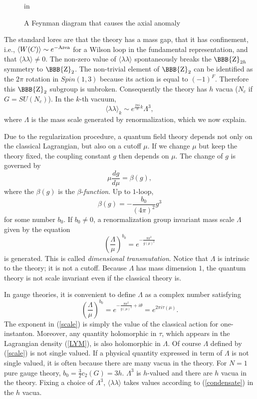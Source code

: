 \documentclass[lecture]{qft-l}
\newcommand{\lam}{\lambda}
\newcommand{\tht}{\theta}
\newcommand{\Lam}{\varLambda}
\newcommand{\ZZ}{{\mbox{\BBB{Z}}}}
\newcommand{\bef}{\begin{figure}[h]
		\vspace{3ex}}
\newcommand{\enf}{\end{figure}}
\newcommand{\bra}{\langle}
\newcommand{\ket}{\rangle}
\newcommand{\e}[1]{e^{{#1}}}
\newcommand{\ii}{i}
\newcommand{\dr}{d}
\numberwithin{figure}{chapter}
\begin{document}
\bef
{} in
\centerline{}
\caption{\protect\label{AX}A Feynman diagram that causes the axial anomaly}
\enf

The standard lores are that the theory has a mass gap,
that it has confinement, i.e., $\bra W(C)\ket\sim\e{-{{\rm Area}}}$
for a Wilson loop in the fundamental representation,
and that $\bra\lam\lam\ket\ne0$.
The non-zero value of $\bra\lam\lam\ket$ spontaneously breaks the $\ZZ_{2h}$
symmetry to $\ZZ_2$.
The non-trivial element of $\ZZ_2$ can be identified as the $2\pi$ rotation 
in $\mathit{Spin}(1,3)$ because its action is equal to $(-1)^F$.
Therefore this $\ZZ_2$ subgroup is unbroken.
Consequently the theory has $h$ vacua ($N_c$ if $G=SU(N_c)$).
In the $k$-th vacuum,
	\begin{equation}\label{condensate}
\bra\lam\lam\ket_k\sim\e{\frac{2\pi\ii}{h}k}\Lam^3,
	\end{equation}
where $\Lam$ is the mass scale generated by renormalization, which we now
explain.

Due to the regularization procedure, a quantum field theory depends 
not only on the classical Lagrangian, but also on a cutoff $\mu$.
If we change $\mu$ but keep the theory fixed, the coupling constant $g$
then depends on $\mu$.
The change of $g$ is governed by
        \begin{equation}\label{beta}
\mu\frac{\dr g}{\dr\mu}=\beta(g),
        \end{equation}
where the $\beta(g)$ is the $\beta$-{\em function}.
Up to $1$-loop,
	\begin{equation}\label{1loop}
\beta(g)=-\frac{b_0}{(4\pi)^2}g^3
	\end{equation}
for some number $b_0$.
If $b_0\ne0$, a renormalization group invariant mass scale $\Lam$
given by the equation
\begin{equation}
\left(\frac{\Lam}{\mu}\right)^{b_0}=\e{-\frac{8\pi^2}{g(\mu)^2}}
\end{equation}
is generated.
This is called {\em dimensional transmutation}.
Notice that $\Lam$ is intrinsic to the theory; it is not a cutoff. 
Because $\Lam$ has mass dimension $1$, the quantum theory is not scale 
invariant even if the classical theory is.

In gauge theories, it is convenient to define $\Lam$ as a complex number 
satisfying
	\begin{equation}\label{scale}
\left(\frac{\Lam}{\mu}\right)^{b_0}=\e{-\frac{8\pi^2}{g(\mu)^2}+\ii\tht}
=\e{2\pi\ii\tau(\mu)}.
	\end{equation}
The exponent in (\ref{scale}) is simply the value of the classical
action for one-instanton.
Moreover, any quantity holomorphic in $\tau$, which appears in the Lagrangian
density (\ref{LYM}), is also holomorphic in $\Lam$.
Of course $\Lam$ defined by (\ref{scale}) is not single valued.
If a physical quantity expressed in term of $\Lam$ is not single valued,
it is often because there are many vacua in the theory.
For $N=1$ pure gauge theory, $b_0=\frac{3}{2}c_2(G)=3h$.
$\Lam^3$ is $h$-valued and there are $h$ vacua in the theory.
Fixing a choice of $\Lam^3$, $\bra\lam\lam\ket$ takes values 
according to (\ref{condensate}) in the $h$ vacua.
\end{document}
